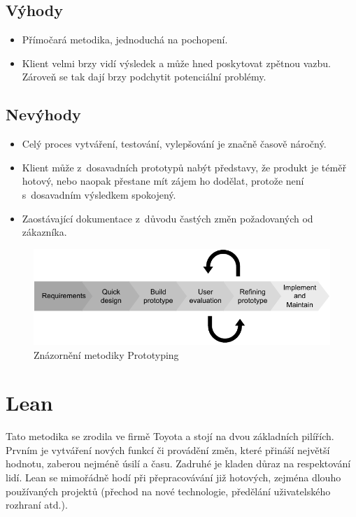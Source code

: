 \documentclass[thesis=M,czech]{FITthesis}[2019/12/23]
\begin{document}
\subsection*{Výhody}
\begin{itemize}
    \item Přímočará metodika, jednoduchá na pochopení.
    \item Klient velmi brzy vidí  výsledek a může hned poskytovat zpětnou vazbu. Zároveň se tak dají brzy podchytit potenciální problémy.
\end{itemize}

\subsection*{Nevýhody}
\begin{itemize}
    \item Celý proces vytváření, testování, vylepšování je značně časově náročný.
    \item Klient může z~dosavadních prototypů nabýt představy, že produkt je téměř hotový, nebo naopak přestane mít zájem ho dodělat, protože není s~dosavadním výsledkem spokojený.
    \item Zaostávající dokumentace z~důvodu častých změn požadovaných od zákazníka.
\end{itemize}

\begin{figure}[H]
	\centering
	\includegraphics[width=1\linewidth]{images/prototyping.pdf}
  	\caption{Znázornění metodiky Prototyping}
  	\label{dia:prototyping}
\end{figure}

\section{Lean \cite{lean}}
Tato metodika se zrodila ve firmě Toyota a stojí na dvou základních pilířích. Prvním je vytváření nových funkcí či provádění změn, které přináší největší hodnotu, zaberou nejméně úsilí a času. Zadruhé je kladen důraz na respektování lidí. Lean se mimořádně hodí při přepracovávání již hotových, zejména dlouho používaných projektů (přechod na nové technologie, předělání uživatelského rozhraní atd.).
\end{document}
